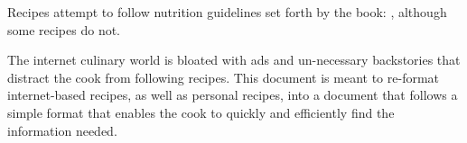 \documentclass[../recipe-collections/cooking.tex]{subfiles}
\begin{document}
Recipes attempt to follow nutrition guidelines set forth by the book:
 \autocite{bernstein_2011}, although some recipes
do not.

\bigskip

The internet culinary world is bloated with ads and un-necessary backstories that distract the cook 
from following recipes. This document is meant to re-format internet-based recipes, as well as 
personal recipes, into a document that follows a simple format that enables the cook to quickly 
and efficiently find the information needed.
\end{document}
